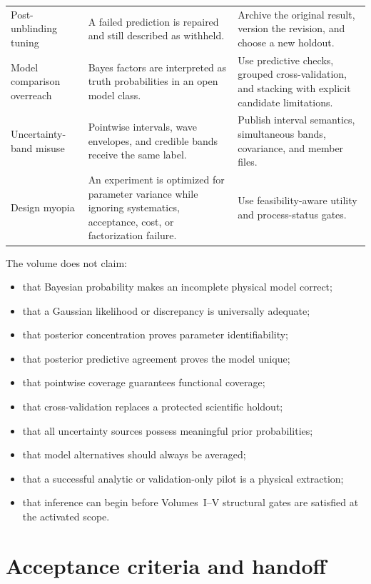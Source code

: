 \documentclass[11pt]{article}
\begin{document}
\begin{longtable}{L{0.22\textwidth}L{0.32\textwidth}L{0.37\textwidth}}
Post-unblinding tuning &
A failed prediction is repaired and still described as withheld. &
Archive the original result, version the revision, and choose a new holdout.\\
Model comparison overreach &
Bayes factors are interpreted as truth probabilities in an open model class. &
Use predictive checks, grouped cross-validation, and stacking with explicit
candidate limitations.\\
Uncertainty-band misuse &
Pointwise intervals, wave envelopes, and credible bands receive the same label. &
Publish interval semantics, simultaneous bands, covariance, and member files.\\
Design myopia &
An experiment is optimized for parameter variance while ignoring systematics,
acceptance, cost, or factorization failure. &
Use feasibility-aware utility and process-status gates.\\
\bottomrule
\end{longtable}

The volume does not claim:
\begin{itemize}
\item that Bayesian probability makes an incomplete physical model correct;
\item that a Gaussian likelihood or discrepancy is universally adequate;
\item that posterior concentration proves parameter identifiability;
\item that posterior predictive agreement proves the model unique;
\item that pointwise coverage guarantees functional coverage;
\item that cross-validation replaces a protected scientific holdout;
\item that all uncertainty sources possess meaningful prior probabilities;
\item that model alternatives should always be averaged;
\item that a successful analytic or validation-only pilot is a physical
extraction;
\item that inference can begin before Volumes~I--V structural gates are
satisfied at the activated scope.
\end{itemize}

\section{Acceptance criteria and handoff}
\label{sec:acceptance}
\end{document}
